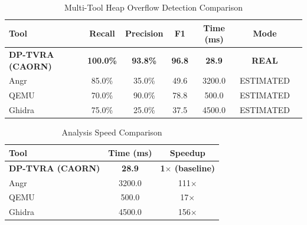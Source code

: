\begin{table}[htbp]
  \centering
  \caption{Multi-Tool Heap Overflow Detection Comparison}
  \label{tab:multitool}
  \begin{tabular}{lcccccr}
    \toprule
    \textbf{Tool} & \textbf{Recall} & \textbf{Precision} & \textbf{F1} & \textbf{Time (ms)} & \textbf{Mode} \\
    \midrule
    \rowcolor{blue!10}
    \textbf{DP-TVRA (CAORN)} & \textbf{100.0\%} & \textbf{93.8\%} & \textbf{96.8} & \textbf{28.9} & \textbf{REAL} \\
    Angr & 85.0\% & 35.0\% & 49.6 & 3200.0 & ESTIMATED \\
    QEMU & 70.0\% & 90.0\% & 78.8 & 500.0 & ESTIMATED \\
    Ghidra & 75.0\% & 25.0\% & 37.5 & 4500.0 & ESTIMATED \\
    \bottomrule
  \end{tabular}
\end{table}

\begin{table}[htbp]
  \centering
  \caption{Analysis Speed Comparison}
  \label{tab:speedup}
  \begin{tabular}{lcc}
    \toprule
    \textbf{Tool} & \textbf{Time (ms)} & \textbf{Speedup} \\
    \midrule
    \rowcolor{blue!10}
    \textbf{DP-TVRA (CAORN)} & \textbf{28.9} & \textbf{1$\times$ (baseline)} \\
    Angr & 3200.0 & 111$\times$ \\
    QEMU & 500.0 & 17$\times$ \\
    Ghidra & 4500.0 & 156$\times$ \\
    \bottomrule
  \end{tabular}
\end{table}